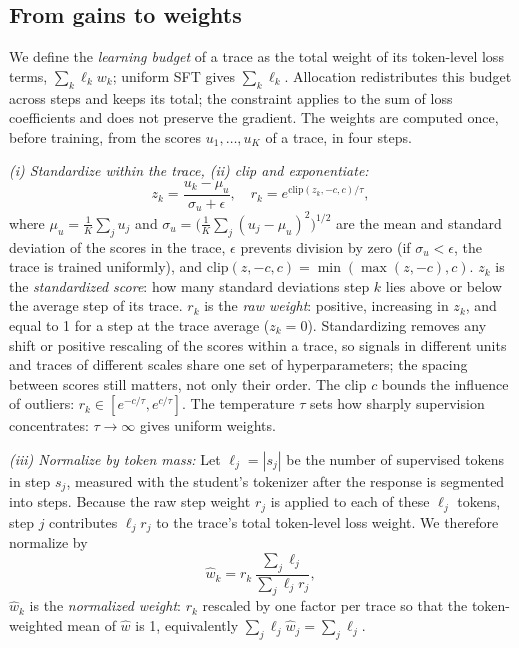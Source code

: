 \subsection{From gains to weights}
\label{sec:weights}

We define the \emph{learning budget} of a trace as the total weight of its token-level loss terms, $\sum_k\ell_k w_k$; uniform SFT gives $\sum_k\ell_k$.
Allocation redistributes this budget across steps and keeps its total; the constraint applies to the sum of loss coefficients and does not preserve the gradient.
The weights are computed once, before training, from the scores $u_1,\dots,u_K$ of a trace, in four steps.

\emph{(i) Standardize within the trace, (ii) clip and exponentiate:}
\begin{equation}
  z_k=\frac{u_k-\mu_u}{\sigma_u+\epsilon},\quad r_k=e^{\mathrm{clip}(z_k,-c,c)/\tau},
  \label{eq:z}
\end{equation}
where $\mu_u=\frac1K\sum_j u_j$ and $\sigma_u=\big(\frac1K\sum_j(u_j-\mu_u)^2\big)^{1/2}$ are the mean and standard deviation of the scores in the trace, $\epsilon$ prevents division by zero (if $\sigma_u<\epsilon$, the trace is trained uniformly), and $\mathrm{clip}(z,-c,c)=\min(\max(z,-c),c)$.
$z_k$ is the \emph{standardized score}: how many standard deviations step $k$ lies above or below the average step of its trace.
$r_k$ is the \emph{raw weight}: positive, increasing in $z_k$, and equal to 1 for a step at the trace average ($z_k=0$).
Standardizing removes any shift or positive rescaling of the scores within a trace, so signals in different units and traces of different scales share one set of hyperparameters; the spacing between scores still matters, not only their order.
The clip $c$ bounds the influence of outliers: $r_k\in[e^{-c/\tau},e^{c/\tau}]$.
The temperature $\tau$ sets how sharply supervision concentrates: $\tau\to\infty$ gives uniform weights.

\emph{(iii) Normalize by token mass:}
Let $\ell_j=|s_j|$ be the number of supervised tokens in step $s_j$, measured with the student's tokenizer after the response is segmented into steps.
Because the raw step weight $r_j$ is applied to each of these $\ell_j$ tokens, step $j$ contributes $\ell_j r_j$ to the trace's total token-level loss weight.
We therefore normalize by
\begin{equation}
  \hat w_k=r_k\,\frac{\sum_j\ell_j}{\sum_j\ell_j r_j},
  \label{eq:mass}
\end{equation}
$\hat w_k$ is the \emph{normalized weight}: $r_k$ rescaled by one factor per trace so that the token-weighted mean of $\hat w$ is 1, equivalently $\sum_j\ell_j\hat w_j=\sum_j\ell_j$.

